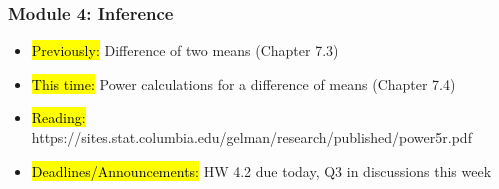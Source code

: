 
\begin{frame}
    \frametitle{Module 4: Inference}
    \begin{itemize}
        \item \hl{Previously: }Difference of two means (Chapter 7.3)
        \item \hl{This time: }Power calculations for a difference of means (Chapter 7.4)
        \item \hl{Reading: }https://sites.stat.columbia.edu/gelman/research/published/power5r.pdf
        \item \hl{Deadlines/Announcements: }HW 4.2 due today, Q3 in discussions this week
    \end{itemize}
    
\end{frame}